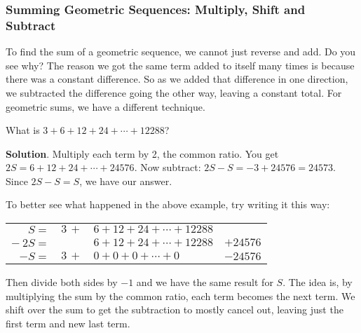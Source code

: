 \documentclass[11pt,]{book}
\theoremstyle{ptxplainnotitle}
\theoremstyle{ptxplaintitle}
\theoremstyle{ptxdefinitionnotitle}
\theoremstyle{ptxdefinitiontitle}
\theoremstyle{ptxdefinitionnotitle}
\theoremstyle{ptxdefinitiontitle}
\theoremstyle{ptxdefinitionnotitle}
\theoremstyle{ptxdefinitiontitle}
\theoremstyle{ptxdefinitiontitlenonumber}
\theoremstyle{ptxdefinitiontitlenonumber}
\numberwithin{equation}{chapter}
\newcommand{\hrulethin}  {\noalign{\hrule height 0.04em}}
\begin{document}
\subsubsection[{Summing Geometric Sequences: Multiply, Shift and Subtract}]{Summing Geometric Sequences: Multiply, Shift and Subtract}\label{subsubsection-2}
\hypertarget{p-199}{}%
To find the sum of a geometric sequence, we cannot just reverse and add. Do you see why? The reason we got the same term added to itself many times is because there was a constant difference. So as we added that difference in one direction, we subtracted the difference going the other way, leaving a constant total. For geometric sums, we have a different technique.%
\begin{example}\label{example-10}
\hypertarget{p-200}{}%
What is \(3 + 6 + 12 + 24 + \cdots + 12288\)?%
\par\smallskip%
\noindent\textbf{Solution}.\hypertarget{solution-16}{}\quad%
\hypertarget{p-201}{}%
Multiply each term by 2, the common ratio. You get \(2S = 6 + 12 + 24 + \cdots + 24576\). Now subtract: \(2S - S = -3 + 24576 = 24573\). Since \(2S - S = S\), we have our answer.%
\end{example}
\hypertarget{p-202}{}%
To better see what happened in the above example, try writing it this way:%
\begin{sidebyside}{1}{0}{0}{0}
\begin{sbspanel}{1}
{\centering%
\begin{tabular}{rlll}
\(S=\)&\(3 \, +\)&\(6 + 12 + 24 + \cdots + 12288\)&\tabularnewline[0pt]
\(-~2S=\)&&\(6 + 12 + 24 + \cdots + 12288\)&\(+ 24576\)\tabularnewline\hrulethin
\(-S = \)&\(3 \, +\)&\(0 + 0 + 0 +  \cdots + 0 \)&\(-24576\)
\end{tabular}
\par}
\end{sbspanel}
\end{sidebyside}
\par
\hypertarget{p-203}{}%
Then divide both sides by \(-1\) and we have the same result for \(S\). The idea is, by multiplying the sum by the common ratio, each term becomes the next term. We shift over the sum to get the subtraction to mostly cancel out, leaving just the first term and new last term.%
\end{document}
